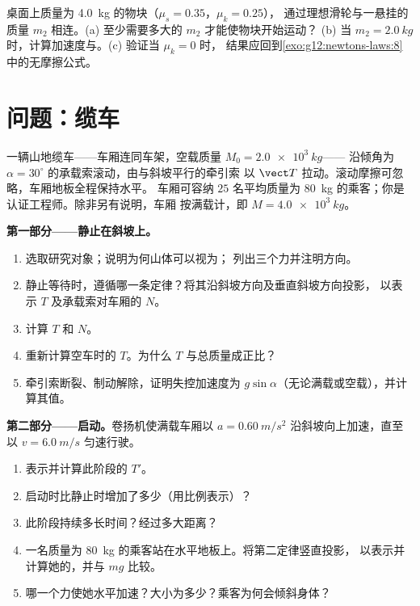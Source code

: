 \begin{exercise}[$\star\star\star$]\label{exo:g12:newtons-laws:15}
桌面上质量为 \qty{4.0}{kg} 的物块（$\mu_s = 0.35$，$\mu_k = 0.25$），
通过理想滑轮与一悬挂的质量 $m_2$ 相连。(a) 至少需要多大的 $m_2$ 才能使物块开始运动？
(b) 当 $m_2 = \qty{2.0}{kg}$ 时，计算加速度与。(c) 验证当 $\mu_k = 0$ 时，
结果应回到\cref{exo:g12:newtons-laws:8}中的无摩擦公式。
\end{exercise}

\section{问题：缆车}

\begin{problem}
\label{pb:g12:newtons-laws:1}
一辆山地缆车——车厢连同车架，空载质量 $M_0 = \qty{2.0e3}{kg}$——
沿倾角为 $\alpha = 30^\circ$ 的承载索滚动，由与斜坡平行的牵引索
以 $\vect T$ 拉动。滚动摩擦可忽略，车厢地板全程保持水平。
车厢可容纳 $25$ 名平均质量为
\qty{80}{kg} 的乘客；你是认证工程师。除非另有说明，车厢
按满载计，即 $M = \qty{4.0e3}{kg}$。

\medskip
\noindent\textbf{第一部分——静止在斜坡上。}
\begin{enumerate}
  \item 选取研究对象；说明为何山体可以视为；
        列出三个力并注明方向。
  \item 静止等待时，遵循哪一条定律？将其沿斜坡方向及垂直斜坡方向投影，
        以表示 $T$ 及承载索对车厢的 $N$。
  \item 计算 $T$ 和 $N$。
  \item 重新计算空车时的 $T$。为什么 $T$ 与总质量成正比？
  \item 牵引索断裂、制动解除，证明失控加速度为
        $g \sin\alpha$（无论满载或空载），并计算其值。
\end{enumerate}

\medskip
\noindent\textbf{第二部分——启动。}卷扬机使满载车厢以
$a = \qty{0.60}{m/s^2}$ 沿斜坡向上加速，直至以 $v = \qty{6.0}{m/s}$ 匀速行驶。
\begin{enumerate}[resume]
  \item 表示并计算此阶段的 $T'$。
  \item 启动时比静止时增加了多少（用比例表示）？
  \item 此阶段持续多长时间？经过多大距离？
  \item 一名质量为 \qty{80}{kg} 的乘客站在水平地板上。将第二定律竖直投影，
        以表示并计算她的，并与 $mg$ 比较。
  \item 哪一个力使她水平加速？大小为多少？乘客为何会倾斜身体？
\end{enumerate}


\end{problem}
